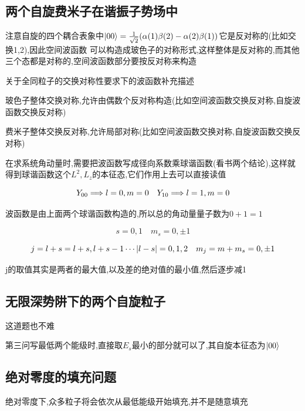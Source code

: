 \documentclass{article}
\begin{document}
        \subsection{两个自旋费米子在谐振子势场中}
            注意自旋的四个耦合表象中$\ket{00} = \frac{1}{\sqrt{2}} (\alpha(1)\beta(2) - \alpha(2)\beta(1))$它是反对称的(比如交换1,2),因此空间波函数
            可以构造成玻色子的对称形式,这样整体是反对称的,而其他三个态都是对称的,空间波函数部分要按反对称来构造
            \begin{formal}
                关于全同粒子的交换对称性要求下的波函数补充描述
                
                玻色子整体交换对称,允许由偶数个反对称构造(比如空间波函数交换反对称,自旋波函数交换反对称)
                
                费米子整体交换反对称,允许局部对称(比如空间波函数交换对称,自旋波函数交换反对称)
            \end{formal}
            
            在求系统角动量时,需要把波函数写成径向系数乘球谐函数(看书两个结论),这样就得到球谐函数这个$L^{2},L_{z}$的本征态,它们作用上去可以直接读值

            $$Y_{00} \Longrightarrow l=0,m=0 \quad Y_{10} \Longrightarrow l=1,m=0 $$

            波函数是由上面两个球谐函数构造的,所以总的角动量量子数为$0+1 =1$

            $$s = 0,1 \quad m_{s} = 0,\pm 1$$

            $$ j = l + s = l+s , l+s-1 \cdots \abs{l-s} =0,1,2 \quad m_{j} = m + m_{s} = 0 , \pm 1 $$

            j的取值其实是两者的最大值,以及差的绝对值的最小值,然后逐步减1
            

        \subsection{无限深势阱下的两个自旋粒子}
            这道题也不难

            第三问写最低两个能级时,直接取$E_{s}$最小的部分就可以了,其自旋本征态为$\ket{00}$

        \subsection{绝对零度的填充问题}
            \begin{formal}
                绝对零度下,众多粒子将会依次从最低能级开始填充,并不是随意填充
            \end{formal}
\end{document}
